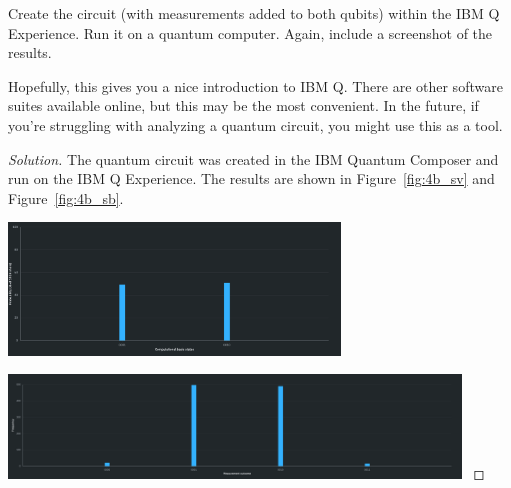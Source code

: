 \begin{solution}[label=ques:4b]
  \begin{question}
    Create the circuit (with measurements added to both qubits) within the IBM Q Experience. Run it on a quantum computer. Again, include a screenshot of the results.

Hopefully, this gives you a nice introduction to IBM Q. There are other software suites available online, but this may be the most convenient. In the future, if you're struggling with analyzing a quantum circuit, you might use this as a tool.
  \end{question}
  \tcblower{}
  \begin{proof}[Solution]
    The quantum circuit was created in the IBM Quantum Composer and run on the IBM Q Experience. The results are shown in Figure~\ref{fig:4b_sv} and Figure~\ref{fig:4b_sb}.\par
    \begin{minipage}[t]{\textwidth}
      \centering
      \includegraphics[width=0.66\textwidth]{q4_b_sv.png}
      \label{fig:4b_sv}
    \end{minipage}

    \begin{minipage}[t]{\textwidth}
      \centering
      \includegraphics[width=0.9\textwidth]{q4_b_sherbrooke.png}
      \label{fig:4b_sb}
    \end{minipage}
  \end{proof}
\end{solution}

